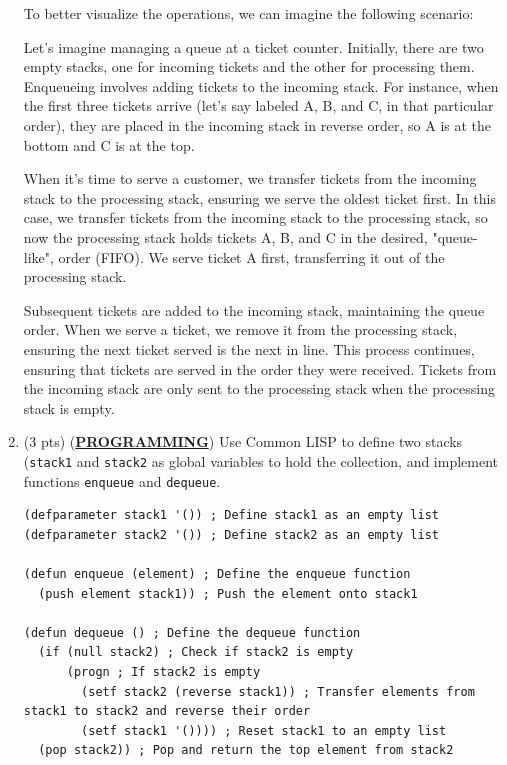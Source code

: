 \documentclass[12pt]{article}
\begin{document}
\begin{spacing}{1.5}
\begin{enumerate}
		      To better visualize the operations, we can imagine the following scenario:
		      		      		      		      
		      Let's imagine managing a queue at a ticket counter. Initially, there are two empty stacks, one for incoming tickets and the other for processing them. Enqueueing involves adding tickets to the incoming stack. For instance, when the first three tickets arrive (let's say labeled A, B, and C, in that particular order), they are placed in the incoming stack in reverse order, so A is at the bottom and C is at the top.
		      		      		      		              
		      When it's time to serve a customer, we transfer tickets from the incoming stack to the processing stack, ensuring we serve the oldest ticket first. In this case, we transfer tickets from the incoming stack to the processing stack, so now the processing stack holds tickets A, B, and C in the desired, "queue-like", order (FIFO). We serve ticket A first, transferring it out of the processing stack.
		      		      		      		              
		      Subsequent tickets are added to the incoming stack, maintaining the queue order. When we serve a ticket, we remove it from the processing stack, ensuring the next ticket served is the next in line. This process continues, ensuring that tickets are served in the order they were received. Tickets from the incoming stack are only sent to the processing stack when the processing stack is empty.
		      		      		      		      
		\item (3 pts) (\textbf{\uline{PROGRAMMING}}) Use Common LISP to define two stacks (\texttt{stack1} and \texttt{stack2} as global variables to hold the collection, and implement functions \texttt{enqueue} and \texttt{dequeue}.
		      		      		      		      
		      \begin{lstlisting}
(defparameter stack1 '()) ; Define stack1 as an empty list
(defparameter stack2 '()) ; Define stack2 as an empty list

(defun enqueue (element) ; Define the enqueue function
  (push element stack1)) ; Push the element onto stack1

(defun dequeue () ; Define the dequeue function
  (if (null stack2) ; Check if stack2 is empty
      (progn ; If stack2 is empty
        (setf stack2 (reverse stack1)) ; Transfer elements from stack1 to stack2 and reverse their order
        (setf stack1 '()))) ; Reset stack1 to an empty list
  (pop stack2)) ; Pop and return the top element from stack2


\end{lstlisting}
\end{enumerate}
\end{spacing}
\end{document}
